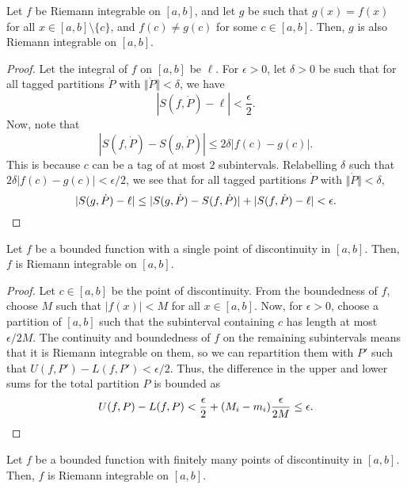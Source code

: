 \documentclass[11pt]{article}
\theoremstyle{definition}
\theoremstyle{remark}
\numberwithin{equation}{module}
\begin{document}
    \begin{theorem}
        Let $f$ be Riemann integrable on $[a, b]$, and let $g$ be such that $g(x) =
        f(x)$ for all $x \in [a, b]\setminus\{c\}$, and $f(c) \neq g(c)$ for some $c
        \in [a, b]$. Then, $g$ is also Riemann integrable on $[a, b]$.
    \end{theorem}
    \begin{proof}
        Let the integral of $f$ on $[a, b]$ be $\ell$. For $\epsilon > 0$, let
        $\delta > 0$ be such that for all tagged partitions $\dot{P}$ with
        $\Vert\dot{P}\Vert < \delta$, we have \[
            |S(f, \dot{P}) - \ell| < \frac{\epsilon}{2}.
        \] Now, note that \[
            |S(f, \dot{P}) - S(g, \dot{P})| \leq 2\delta |f(c) - g(c)|.
        \] This is because $c$ can be a tag of at most $2$ subintervals. Relabelling
        $\delta$ such that $2\delta|f(c) - g(c)| < \epsilon / 2$, we see that for
        all tagged partitions $\dot{P}$ with $\Vert\dot{P}\Vert < \delta$, \[
            |S(g, \dot{P}) - \ell| \leq |S(g, \dot{P}) - S(f, \dot{P})| + |S(f,
            \dot{P}) - \ell| < \epsilon. \qedhere
        \] 
    \end{proof}

    \begin{theorem}
        Let $f$ be a bounded function with a single point of discontinuity in $[a,
        b]$.  Then, $f$ is Riemann integrable on $[a, b]$.
    \end{theorem}
    \begin{proof}
        Let $c \in [a, b]$ be the point of discontinuity. From the boundedness of
        $f$, choose $M$ such that $|f(x)| < M$ for all $x \in [a, b]$. Now, for
        $\epsilon > 0$, choose a partition of $[a, b]$ such that the subinterval
        containing $c$ has length at most $\epsilon / 2M$. The continuity and
        boundedness of $f$ on the remaining subintervals means that it is Riemann
        integrable on them, so we can repartition them with $P'$ such that $U(f, P')
        - L(f, P') < \epsilon / 2$. Thus, the difference in the upper and lower sums
        for the total partition $P$ is bounded as \[
            U(f, P) - L(f, P) < \frac{\epsilon}{2} + (M_i - m_i)\frac{\epsilon}{2M}
            \leq \epsilon. \qedhere
        \] 
    \end{proof}
    \begin{corollary}
        Let $f$ be a bounded function with finitely many points of discontinuity in
        $[a, b]$. Then, $f$ is Riemann integrable on $[a, b]$.
    \end{corollary}
\end{document}
